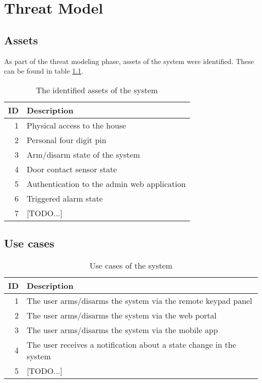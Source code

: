 \chapter{Threat Model} \label{ch:threat-model}
\section{Assets}
As part of the threat modeling phase, assets of the system were identified. These can be found in table \ref{tb:assets}.
\begin{table}[!ht]
    \centering
    \begin{tabular}{r l}
        \hline
        \textbf{ID} & \textbf{Description} \\
        \hline
        1  & Physical access to the house \\
        2  & Personal four digit pin \\
        3  & Arm/disarm state of the system \\
        4  & Door contact sensor state \\
        5  & Authentication to the admin web application \\
        6  & Triggered alarm state \\
        7  & [TODO...] \\
        \hline
    \end{tabular}
    \caption{The identified assets of the system}
    \label{tb:assets}
\end{table}

\section{Use cases}
\begin{table}[!ht]
    \centering
    \begin{tabularx}{\textwidth}{r X}
        \textbf{ID} & \textbf{Description}  \\
        \hline
        1  & The user arms/disarms the system via the remote keypad panel \\
        2  & The user arms/disarms the system via the web portal \\
        3  & The user arms/disarms the system via the mobile app \\
        4  & The user receives a notification about a state change in the system \\
        5  & [TODO...] \\
        \hline
    \end{tabularx}
    \caption{Use cases of the system}
    \label{tb:use-cases}
\end{table}

